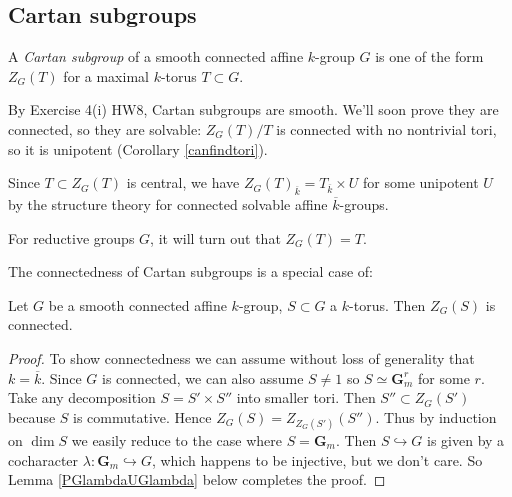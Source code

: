 \documentclass[10pt]{article}
\renewcommand{\(}{\left(}
\renewcommand{\)}{\right)}
\numberwithin{thm}{subsection}
\begin{document}
\subsection{Cartan subgroups}
\begin{defn}\label{}
A \textit{Cartan subgroup} of a smooth connected
affine $k$-group $G$
is one of the form $Z_G(T)$ for a maximal $k$-torus $T\subset G$.
\end{defn}
\begin{rem}\label{}
By Exercise 4(i) HW8, Cartan subgroups are smooth. We'll soon prove they are connected, so they are solvable: $Z_G(T)/T$
is connected with no nontrivial tori, so it is unipotent (Corollary \ref{canfindtori}).
\end{rem}
\begin{rem}\label{}
Since $T\subset Z_G(T)$ is central,
we have $Z_G(T)_{\overline{k}}=T_{\overline{k}}\times U$ for some unipotent $U$
by the structure theory for connected solvable affine $\overline{k}$-groups.
\end{rem}
\begin{rem}\label{}
For reductive groups $G$, it will turn out that $Z_G(T)=T$.
\end{rem}
The connectedness of Cartan subgroups is a special case of:
\begin{thm}\label{centralizeroftorusisconnected}
Let $G$ be a smooth connected affine $k$-group,
$S\subset G$ a $k$-torus.
Then $Z_G(S)$ is connected.
\end{thm}
\begin{proof}
To show connectedness we can assume without loss of generality that $k=\overline{k}$. Since $G$ is connected, we can also assume $S\neq 1$
so $S\simeq \mathbf{G}_m^r$ for some $r$.
Take any decomposition $S=S'\times S''$ into smaller tori.
Then $S''\subset Z_G(S')$
because $S$ is commutative.
Hence $Z_G(S)=Z_{Z_G(S')}(S'')$.
Thus by induction on $\dim S$ we easily reduce to the case
where $S=\mathbf{G}_m$.
Then $S\hookrightarrow G$
is given by a cocharacter $\lambda:\mathbf{G}_m\hookrightarrow G$,
which happens to be injective, but we don't care.
So Lemma \ref{PGlambdaUGlambda} below completes the proof.
\end{proof}
\end{document}
